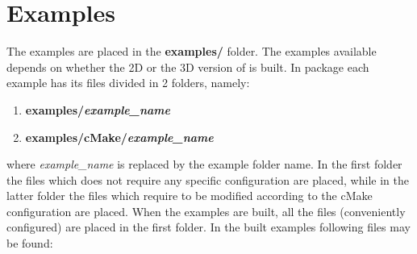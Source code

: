 \section{Examples}
\label{ss:structure::examples}
%
The examples are placed in the \textbf{examples/} folder.
%
The examples available depends on whether the 2D or the 3D version of \NAME is built.
%
In \NAME package each example has its files divided in 2 folders, namely:
%
\begin{enumerate}
	\item \textbf{examples/\textit{example\_name}}
	\item \textbf{examples/cMake/\textit{example\_name}}
\end{enumerate}
%
where \textit{example\_name} is replaced by the example folder name.
%
In the first folder the files which does not require any specific configuration are placed, while in the latter folder the files which require to be modified according to the cMake configuration are placed.
%
When the examples are built, all the files (conveniently configured) are placed in the first folder.\rc
%
In the built examples following files may be found:
%
